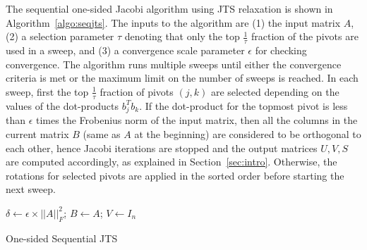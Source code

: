 \documentclass[10pt, conference, compsocconf]{IEEEtran}
\begin{document}
The sequential one-sided Jacobi algorithm using JTS relaxation is shown in Algorithm~\ref{algo:seqjts}. The inputs to the algorithm are (1) the input matrix $A$, (2) a selection parameter $\tau$ denoting that only the top $\frac{1}{\tau}$ fraction of the pivots are used in a sweep, and (3) a convergence scale parameter $\epsilon$ for checking convergence. The algorithm runs multiple sweeps until either the convergence criteria is met or the maximum limit on the number of sweeps is reached. In each sweep, first the top $\frac{1}{\tau}$ fraction of pivots $(j,k)$ are selected depending on the values of the dot-products $b_j^T b_k$. If the dot-product for the topmost pivot is less than $\epsilon$ times the Frobenius norm of the input matrix, then all the columns in the current matrix $B$ (same as $A$ at the beginning) are considered to be orthogonal to each other, hence Jacobi iterations are stopped and the output matrices $U,V,S$ are computed accordingly, as explained in Section~\ref{sec:intro}. Otherwise, the rotations for selected pivots are applied in the sorted order before starting the next sweep.

\begin{algorithm}
$\delta \gets \epsilon \times ||A||^2_F$; \quad $B \gets A$; \quad $V \gets I_n$\;
\caption{One-sided Sequential JTS}
\label{algo:seqjts}
\end{algorithm}
\end{document}
